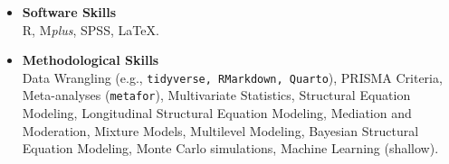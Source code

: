 \documentclass[hidelinks, letterpaper,10pt]{article} %
\begin{document}
\begin{itemize} 
\setlength{\topsep}{0pt}%
\setlength{\leftmargin}{0.1in}%

\item \textbf{Software Skills}\\
R, M\textit{plus}, SPSS, \LaTeX.

\item \textbf{Methodological Skills}\\
Data Wrangling (e.g., \texttt{tidyverse, RMarkdown, Quarto}), PRISMA Criteria, Meta-analyses (\texttt{metafor}), Multivariate Statistics, Structural Equation Modeling, Longitudinal Structural Equation Modeling, Mediation and Moderation, Mixture Models, Multilevel Modeling, Bayesian Structural Equation Modeling, Monte Carlo simulations, Machine Learning (shallow).


\end{itemize}
\end{document}
